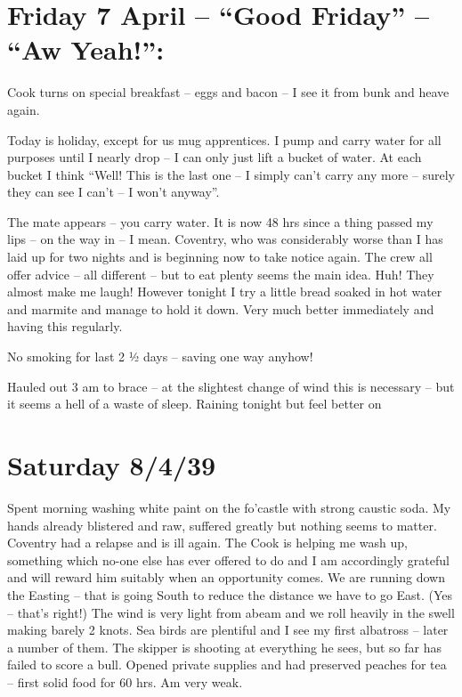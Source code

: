 \documentclass[
  11pt,
  msmallroyalvopaper
]{memoir}
\begin{document}
\hypertarget{friday-7-april-good-friday-aw-yeah}{%
\section{Friday 7 April -- “Good Friday” -- “Aw
Yeah!”:}\label{friday-7-april-good-friday-aw-yeah}}

Cook turns on special breakfast -- eggs and bacon -- I see it from bunk
and heave again.

Today is holiday, except for us mug apprentices. I pump and carry water
for all purposes until I nearly drop -- I can only just lift a bucket of
water. At each bucket I think ``Well! This is the last one -- I simply
can't carry any more -- surely they can see I can't -- I won't anyway''.

The mate appears -- you carry water. It is now 48 hrs since a thing
passed my lips -- on the way in -- I mean. Coventry, who was
considerably worse than I has laid up for two nights and is beginning
now to take notice again. The crew all offer advice -- all different --
but to eat plenty seems the main idea. Huh! They almost make me laugh!
However tonight I try a little bread soaked in hot water and marmite and
manage to hold it down. Very much better immediately and having this
regularly.

No smoking for last 2 ½ days -- saving one way anyhow!

Hauled out 3 am to brace -- at the slightest change of wind this is
necessary -- but it seems a hell of a waste of sleep. Raining tonight
but feel better on

\hypertarget{saturday-8439}{%
\section{Saturday 8/4/39}\label{saturday-8439}}

Spent morning washing white paint on the fo'castle with strong caustic
soda. My hands already blistered and raw, suffered greatly but nothing
seems to matter. Coventry had a relapse and is ill again. The Cook is
helping me wash up, something which no-one else has ever offered to do
and I am accordingly grateful and will reward him suitably when an
opportunity comes. We are running down the Easting -- that is going
South to reduce the distance we have to go East. (Yes -- that's right!)
The wind is very light from abeam and we roll heavily in the swell
making barely 2 knots. Sea birds are plentiful and I see my first
albatross -- later a number of them. The skipper is shooting at
everything he sees, but so far has failed to score a bull. Opened
private supplies and had preserved peaches for tea -- first solid food
for 60 hrs. Am very weak.
\end{document}
